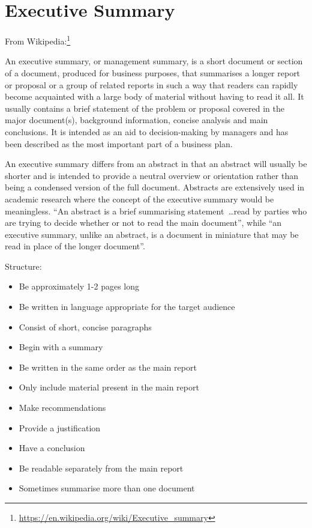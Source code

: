 
\clearpage
\section*{Executive Summary}
\label{sec:summary}


From Wikipedia:\footnote{\url{https://en.wikipedia.org/wiki/Executive_summary}}

An executive summary, or management summary, is a short document or section of a document, produced for business purposes, that summarises a longer report or proposal or a group of related reports in such a way that readers can rapidly become acquainted with a large body of material without having to read it all. It usually contains a brief statement of the problem or proposal covered in the major document(s), background information, concise analysis and main conclusions. It is intended as an aid to decision-making by managers and has been described as the most important part of a business plan.

An executive summary differs from an abstract in that an abstract will usually be shorter and is intended to provide a neutral overview or orientation rather than being a condensed version of the full document. Abstracts are extensively used in academic research where the concept of the executive summary would be meaningless. ``An abstract is a brief summarising statement~\dots read by parties who are trying to decide whether or not to read the main document'', while ``an executive summary, unlike an abstract, is a document in miniature that may be read in place of the longer document''.

Structure:
\begin{itemize}
	\item Be approximately 1-2 pages long
	\item Be written in language appropriate for the target audience
	\item Consist of short, concise paragraphs
	\item Begin with a summary
	\item Be written in the same order as the main report
	\item Only include material present in the main report
	\item Make recommendations
	\item Provide a justification
	\item Have a conclusion
	\item Be readable separately from the main report
	\item Sometimes summarise more than one document
\end{itemize}

